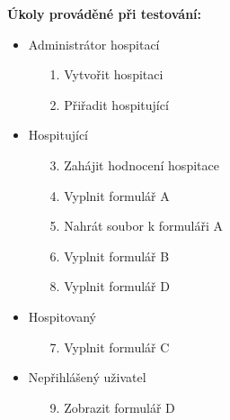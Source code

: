 \textbf{Úkoly prováděné při testování:}
\begin{itemize}
\item Administrátor hospitací
	\begin{itemize}
		\item[1.] Vytvořit hospitaci
		\item[2.] Přiřadit hospitující
	\end{itemize}
\item Hospitující
	\begin{itemize}
		\item[3.] Zahájit hodnocení hospitace
		\item[4.] Vyplnit formulář A
		\item[5.] Nahrát soubor k formuláři A
		\item[6.] Vyplnit formulář B
		\item[8.] Vyplnit formulář D
	\end{itemize}
\item Hospitovaný
	\begin{itemize}
		\item[7.] Vyplnit formulář C
	\end{itemize}
\item Nepřihlášený uživatel
	\begin{itemize}
		\item[9.] Zobrazit formulář D 
	\end{itemize}
\end{itemize}
